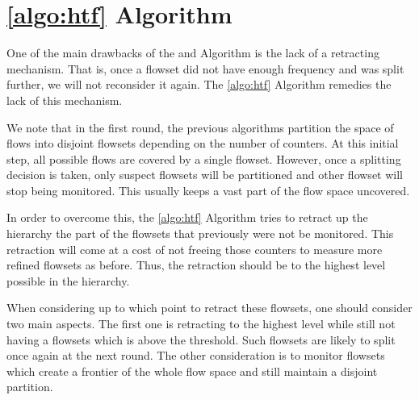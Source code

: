 \section{\ref{algo:htf} Algorithm}

One of the main drawbacks of the \simpleAlgo and \multipleAlgo Algorithm is the lack of a retracting mechanism. That is, once a flowset did not have enough frequency and was split further, we will not reconsider it again. The \ref{algo:htf} Algorithm remedies the lack of this mechanism.

We note that in the first round, the previous algorithms partition the space of flows into disjoint flowsets depending on the number of counters. At this initial step, all possible flows are covered by a single flowset. However, once a splitting decision is taken, only suspect flowsets will be partitioned and other flowset will stop being monitored. This usually keeps a vast part of the flow space uncovered.

In order to overcome this, the \ref{algo:htf} Algorithm tries to retract up the hierarchy the part of the flowsets that previously were not be monitored. This retraction will come at a cost of not freeing those counters to measure more refined flowsets as before. Thus, the retraction should be to the highest level possible in the hierarchy.

When considering up to which point to retract these flowsets, one should consider two main aspects. The first one is retracting to the highest level while still not having a flowsets which is above the threshold. Such flowsets are likely to split once again at the next round. The other consideration is to monitor flowsets which create a frontier of the whole flow space and still maintain a disjoint partition.

